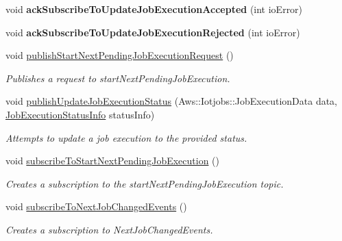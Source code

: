 \begin{DoxyCompactItemize}
\mbox{\label{class_aws_1_1_iot_1_1_device_client_1_1_jobs_1_1_jobs_feature_a881265a4086c4c66345d34f563f12280}} 
void {\bfseries ack\+Subscribe\+To\+Update\+Job\+Execution\+Accepted} (int io\+Error)
\item 
\mbox{\label{class_aws_1_1_iot_1_1_device_client_1_1_jobs_1_1_jobs_feature_aad6b16ad9e5bffe134be6ba660ad5fea}} 
void {\bfseries ack\+Subscribe\+To\+Update\+Job\+Execution\+Rejected} (int io\+Error)
\item 
void \hyperlink{class_aws_1_1_iot_1_1_device_client_1_1_jobs_1_1_jobs_feature_a546393fde6216c790c95d6a7a6903ddc}{publish\+Start\+Next\+Pending\+Job\+Execution\+Request} ()
\begin{DoxyCompactList}\small\item\em Publishes a request to start\+Next\+Pending\+Job\+Execution. \end{DoxyCompactList}\item 
void \hyperlink{class_aws_1_1_iot_1_1_device_client_1_1_jobs_1_1_jobs_feature_af56753139f5926916926fc15d1b43f58}{publish\+Update\+Job\+Execution\+Status} (Aws\+::\+Iotjobs\+::\+Job\+Execution\+Data data, \hyperlink{struct_aws_1_1_iot_1_1_device_client_1_1_jobs_1_1_jobs_feature_1_1_job_execution_status_info}{Job\+Execution\+Status\+Info} status\+Info)
\begin{DoxyCompactList}\small\item\em Attempts to update a job execution to the provided status. \end{DoxyCompactList}\item 
void \hyperlink{class_aws_1_1_iot_1_1_device_client_1_1_jobs_1_1_jobs_feature_ab76653347635a003fda9e3748ee8d053}{subscribe\+To\+Start\+Next\+Pending\+Job\+Execution} ()
\begin{DoxyCompactList}\small\item\em Creates a subscription to the start\+Next\+Pending\+Job\+Execution topic. \end{DoxyCompactList}\item 
void \hyperlink{class_aws_1_1_iot_1_1_device_client_1_1_jobs_1_1_jobs_feature_a38337467d49ff8804886cb4cd5aa61d0}{subscribe\+To\+Next\+Job\+Changed\+Events} ()
\begin{DoxyCompactList}\small\item\em Creates a subscription to Next\+Job\+Changed\+Events. \end{DoxyCompactList}\item 

\end{DoxyCompactItemize}
